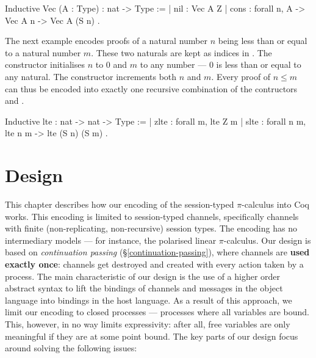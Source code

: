 \documentclass{mproj}
\newcommand{\picalc}{$\pi$-calculus}
\begin{document}
\begin{coq}
Inductive Vec (A : Type) : nat -> Type :=
| nil  : Vec A Z
| cons : forall {n}, A -> Vec A n -> Vec A (S n)
.
\end{coq}

The next example encodes proofs of a natural number $n$ being less than or equal to a natural number $m$. These two naturals are kept as indices in . The constructor  initialises $n$ to 0 and $m$ to any number --- 0 is less than or equal to any natural. The constructor  increments both $n$ and $m$. Every proof of $n \leq m$ can thus be encoded into exactly one recursive combination of the contructors  and .

\begin{coq}
Inductive lte : nat -> nat -> Type :=
| zlte : forall {m}, lte Z m
| slte : forall {n m}, lte n m -> lte (S n) (S m)
.
\end{coq}

\chapter{Design}\label{design}

This chapter describes how our encoding of the session-typed \picalc{} into Coq works. This encoding is limited to session-typed channels, specifically channels with finite (non-replicating, non-recursive) session types. The encoding has no intermediary models --- for instance, the polarised linear \picalc{}. Our design is based on \emph{continuation passing} (\S \ref{continuation-passing}), where channels are \textbf{used exactly once}: channels get destroyed and created with every action taken by a process.  The main characteristic of our design is the use of a higher order abstract syntax to lift the bindings of channels and messages in the object language into bindings in the host language. As a result of this approach, we limit our encoding to closed processes --- processes where all variables are bound. This, however, in no way limits expressivity: after all, free variables are only meaningful if they are at some point bound. The key parts of our design focus around solving the following issues:
\end{document}
